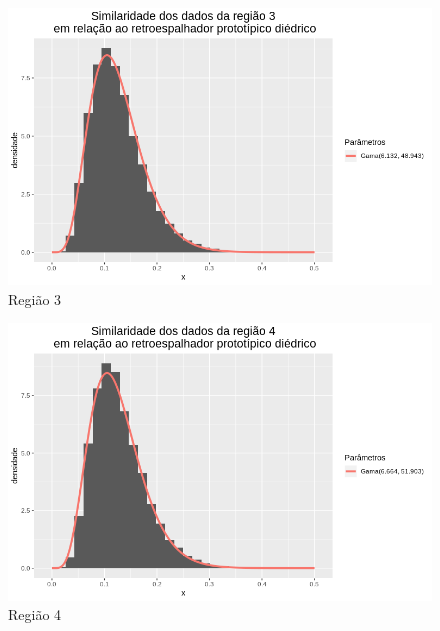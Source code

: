 \documentclass[12pt]{article}
\begin{document}
\begin{figure}[!h]
    \centering
    \vspace{0.1\linewidth}
    \includegraphics[width = 0.95\linewidth]{../../Images/Report_18_12_17/di_region3.png}
    \caption{Região 3}
    \label{fig:di_r3}
\end{figure}

\begin{figure}[!h]
    \centering
    \vspace{0.15\linewidth}
    \includegraphics[width = 0.95\linewidth]{../../Images/Report_18_12_17/di_region4.png}
    \caption{Região 4}
    \label{fig:di_r4}
\end{figure}
\end{document}
